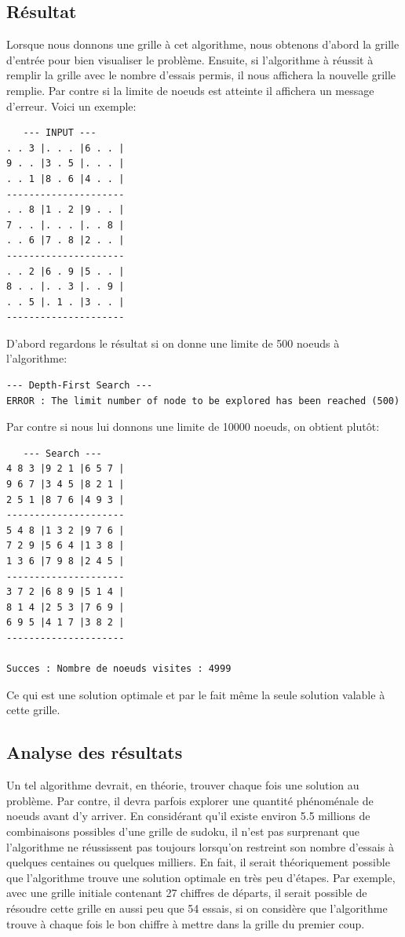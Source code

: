 \documentclass[a4paper,10pt]{article}
\begin{document}
\subsection{Résultat}
\label{sec:res}
Lorsque nous donnons une grille à cet algorithme, nous obtenons  d'abord la grille d'entrée pour bien visualiser le problème. Ensuite, si l'algorithme à réussit à remplir la grille avec le nombre d'essais permis, il nous affichera la nouvelle grille remplie. Par contre si la limite de noeuds est atteinte il affichera un message d'erreur. Voici un exemple:

\begin{verbatim}
   --- INPUT ---
. . 3 |. . . |6 . . |
9 . . |3 . 5 |. . . |
. . 1 |8 . 6 |4 . . |
---------------------
. . 8 |1 . 2 |9 . . |
7 . . |. . . |. . 8 |
. . 6 |7 . 8 |2 . . |
---------------------
. . 2 |6 . 9 |5 . . |
8 . . |. . 3 |. . 9 |
. . 5 |. 1 . |3 . . |
---------------------
\end{verbatim}

D'abord regardons le résultat si on donne une limite de 500 noeuds à l'algorithme:

\begin{verbatim}
--- Depth-First Search ---
ERROR : The limit number of node to be explored has been reached (500)
\end{verbatim}

Par contre si nous lui donnons une limite de 10000 noeuds, on obtient plutôt:

\begin{verbatim}
   --- Search ---
4 8 3 |9 2 1 |6 5 7 |
9 6 7 |3 4 5 |8 2 1 |
2 5 1 |8 7 6 |4 9 3 |
---------------------
5 4 8 |1 3 2 |9 7 6 |
7 2 9 |5 6 4 |1 3 8 |
1 3 6 |7 9 8 |2 4 5 |
---------------------
3 7 2 |6 8 9 |5 1 4 |
8 1 4 |2 5 3 |7 6 9 |
6 9 5 |4 1 7 |3 8 2 |
---------------------

Succes : Nombre de noeuds visites : 4999
\end{verbatim}

Ce qui est une solution optimale et par le fait même la seule solution valable à cette grille.


\subsection{Analyse des résultats}
Un tel algorithme devrait, en théorie, trouver chaque fois une solution au problème. Par contre, il devra parfois explorer une quantité phénoménale de noeuds avant d'y arriver. En considérant qu'il existe environ 5.5 millions de combinaisons possibles d'une grille de sudoku, il n'est pas surprenant que l'algorithme ne réussissent pas toujours lorsqu'on restreint son nombre d'essais à quelques centaines ou quelques milliers. En fait, il serait théoriquement possible que l'algorithme trouve une solution optimale en très peu d'étapes. Par exemple, avec une grille initiale contenant 27 chiffres de départs, il serait possible de résoudre cette grille en aussi peu que 54 essais, si on considère que l'algorithme trouve à chaque fois le bon chiffre à mettre dans la grille du premier coup. \\
\end{document}
